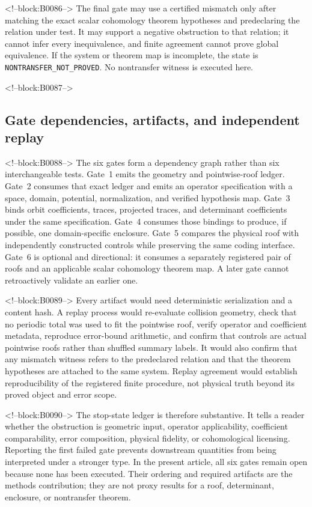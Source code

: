 \documentclass[11pt,a4paper]{article}
\begin{document}
<!--block:B0086-->
The final gate may use a certified mismatch only after matching the exact scalar cohomology theorem hypotheses and predeclaring the relation under test. It may support a negative obstruction to that relation; it cannot infer every inequivalence, and finite agreement cannot prove global equivalence. If the system or theorem map is incomplete, the state is \texttt{NONTRANSFER\_NOT\_PROVED}. No nontransfer witness is executed here.

<!--block:B0087-->
\subsection{Gate dependencies, artifacts, and independent replay}

<!--block:B0088-->
The six gates form a dependency graph rather than six interchangeable tests. Gate~1 emits the geometry and pointwise-roof ledger. Gate~2 consumes that exact ledger and emits an operator specification with a space, domain, potential, normalization, and verified hypothesis map. Gate~3 binds orbit coefficients, traces, projected traces, and determinant coefficients under the same specification. Gate~4 consumes those bindings to produce, if possible, one domain-specific enclosure. Gate~5 compares the physical roof with independently constructed controls while preserving the same coding interface. Gate~6 is optional and directional: it consumes a separately registered pair of roofs and an applicable scalar cohomology theorem map. A later gate cannot retroactively validate an earlier one.

<!--block:B0089-->
Every artifact would need deterministic serialization and a content hash. A replay process would re-evaluate collision geometry, check that no periodic total was used to fit the pointwise roof, verify operator and coefficient metadata, reproduce error-bound arithmetic, and confirm that controls are actual pointwise roofs rather than shuffled summary labels. It would also confirm that any mismatch witness refers to the predeclared relation and that the theorem hypotheses are attached to the same system. Replay agreement would establish reproducibility of the registered finite procedure, not physical truth beyond its proved object and error scope.

<!--block:B0090-->
The stop-state ledger is therefore substantive. It tells a reader whether the obstruction is geometric input, operator applicability, coefficient comparability, error composition, physical fidelity, or cohomological licensing. Reporting the first failed gate prevents downstream quantities from being interpreted under a stronger type. In the present article, all six gates remain open because none has been executed. Their ordering and required artifacts are the methods contribution; they are not proxy results for a roof, determinant, enclosure, or nontransfer theorem.
\end{document}
